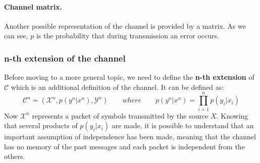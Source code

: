 \paragraph*{Channel matrix.} Another possible representation of the channel is provided by a matrix. As we can see, $p$ is the probability that during transmission an error occurs.

\subsubsection{n-th extension of the channel}
Before moving to a more general topic, we need to define the \textbf{n-th extension} of $\mathcal{C}$ which is an additional definition of the channel. It can be defined as:
$$\mathcal{C}^n = (\mathcal{X}^n, p(y^n|x^n), \mathcal{Y}^n) \qquad where \qquad p(y^n|x^n) = \prod_{i=1}^n p(y_i| x_i)$$
Now $\mathcal{X}^n$  represents a packet of symbols transmitted by the source $X$. 
Knowing that several products of $p(y_i| x_i)$ are made, it is possible to understand that an important assumption of independence has been made, meaning that the channel has no memory of the past messages and each packet is independent from the others.

